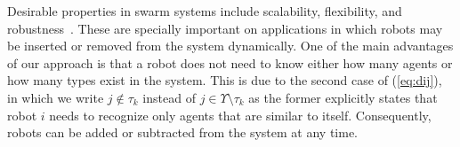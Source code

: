 \documentclass[letterpaper, 10 pt, conference]{ieeeconf}  %
\begin{document}
Desirable properties in swarm systems include scalability,
flexibility, and robustness~\cite{Sahin:04}. These are specially
important on applications in which robots may be inserted or removed
from the system dynamically. One of the main advantages of our
approach is that a robot does not need to know either how many agents
or how many types exist in the system. This is due to the second case
of (\ref{eq:dij}), in which we write $j \not \in \tau_k$ instead of $j
\in \Upsilon \setminus \tau_k$ as the former explicitly states that
robot $i$ needs to recognize only agents that are similar to
itself. Consequently, robots can be added or subtracted from the
system at any time.

\begin{figure}[thpb]
\centering
{}

\end{figure}
\end{document}
